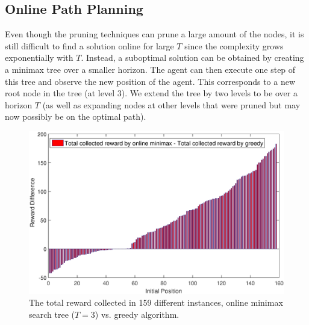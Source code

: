 \documentclass[10 pt, conference]{ieeeconf}
\begin{document}
\subsection{Online Path Planning}
Even though the pruning techniques can prune a large amount of the nodes, it is still difficult to find a solution online for large $T$ since the complexity grows exponentially with $T$. Instead, a suboptimal solution can be obtained by creating a minimax tree over a smaller horizon. The agent can then execute one step of this tree and observe the new position of the agent. This corresponds to a new root node in the tree (at level 3). We extend the tree by two levels to be over a horizon $T$ (as well as expanding nodes at other levels that were pruned but may now possibly be on the optimal path). 


\begin{figure}[H]
\centering
\includegraphics[width=0.80\columnwidth]{figs/Minimax_vs_Greedy3.eps}
\caption{The total reward collected in 159 different instances, online minimax search tree ($T=3$) vs. greedy algorithm.}
\label{Minimax_vs_Greedy}         
\end{figure}
\end{document}
